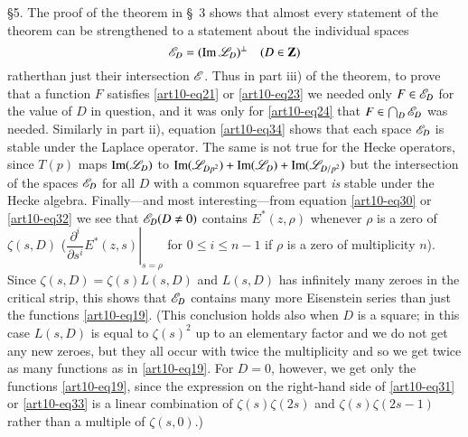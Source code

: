 \S 5. The proof of the theorem in \S~3 shows that almost every statement of the theorem can be strengthened to a statement about the individual spaces 
$$
\mathscr{E}_D = (\operatorname{Im} \mathscr{L}_D)^\perp \quad (D \in \mathbf{Z})
$$
rather\pageoriginale than just their intersection $\mathscr{E}$. Thus in part iii) of the theorem, to prove that a function $F$ satisfies \eqref{art10-eq21} or \eqref{art10-eq23} we needed only $F \in\mathscr{E}_D$ for the value of $D$ in question, and it was only for \eqref{art10-eq24} that $F \in \bigcap_D \mathscr{E}_D$ was needed. Similarly in part ii), equation \eqref{art10-eq34} shows that each space $\mathscr{E}_D$ is stable under the Laplace operator. The same is not true for the Hecke operators, since $T(p)$ maps $\operatorname{Im} (\mathscr{L}_D)$ to $\operatorname{Im} (\mathscr{L}_{Dp^2}) + \operatorname{Im} (\mathscr{L}_D) + \operatorname{Im} (\mathscr{L}_{D/p^2})$ but the intersection of the spaces $\mathscr{E}_D$ for all $D$ with a common squarefree part \textit{is} stable under the Hecke algebra. Finally---and most interesting---from equation \eqref{art10-eq30} or \eqref{art10-eq32} we see that $\mathscr{E}_D(D \neq 0)$ contains $E^\ast (z, \rho)$ whenever $\rho$ is a zero of $\zeta (s,D)$ (\resp $\left.\dfrac{\partial^i}{\partial s^i} E^\ast (z,s) \right|_{s=\rho}$ for $0\leqslant i \leqslant n -1$ if $\rho$ is a zero of multiplicity $n$). Since $\zeta(s,D) = \zeta(s) L(s,D)$ and $L(s,D)$ has infinitely many zeroes in the critical strip, this shows that $\mathscr{E}_D$ contains many more Eisenstein series than just the functions \eqref{art10-eq19}. (This conclusion holds also when $D$ is a square; in this case $L(s,D)$ is equal to $\zeta(s)^2$ up to an elementary factor and we do not get any new zeroes, but they all occur with twice the multiplicity and so we get twice as many functions as in \eqref{art10-eq19}. For $D =0$, however, we get only the functions \eqref{art10-eq19}, since the expression on the right-hand side of \eqref{art10-eq31} or \eqref{art10-eq33} is a linear combination of $\zeta(s) \zeta(2s)$ and $\zeta(s) \zeta(2s -1)$ rather than a multiple of $\zeta(s, 0)$.)


